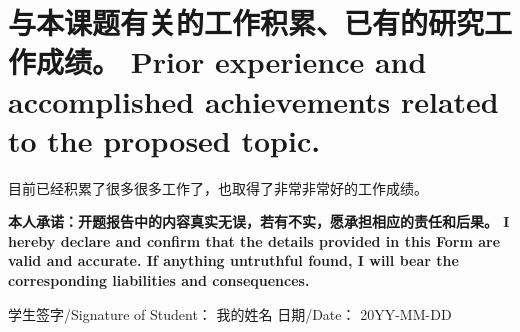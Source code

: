 \documentclass[a4paper,zihao=-4,AutoFakeBold]{ctexart}
\begin{document}
\section{与本课题有关的工作积累、已有的研究工作成绩。
    Prior experience and accomplished achievements 
    related to the proposed topic.}


目前已经积累了很多很多工作了，也取得了非常非常好的工作成绩。




\vspace{\baselineskip}

\normalfont{}\bfseries\fangsong
\noindent
本人承诺：开题报告中的内容真实无误，若有不实，愿承担相应的责任和后果。
I hereby declare and confirm that the details 
provided in this Form are valid and accurate. 
If anything untruthful found, 
I will bear the corresponding liabilities and consequences.

\vspace{\baselineskip}

\noindent
学生签字/Signature of Student： 我的姓名
\hfill              
日期/Date： 20YY-MM-DD
\end{document}
